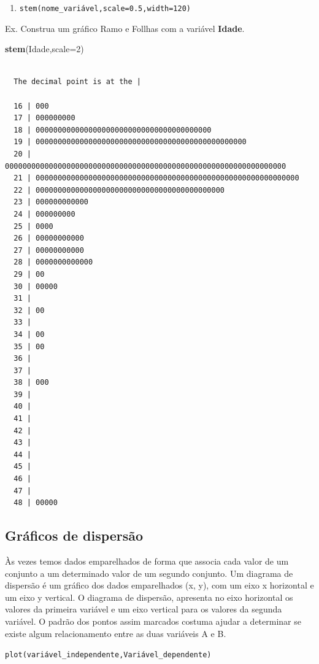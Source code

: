 \documentclass[12pt,brazil,oneside]{book}
\newenvironment{Shaded}{\begin{snugshade}}{\end{snugshade}}
\newcommand{\DataTypeTok}[1]{\textcolor[rgb]{0.13,0.29,0.53}{#1}}
\newcommand{\DecValTok}[1]{\textcolor[rgb]{0.00,0.00,0.81}{#1}}
\newcommand{\KeywordTok}[1]{\textcolor[rgb]{0.13,0.29,0.53}{\textbf{#1}}}
\newcommand{\NormalTok}[1]{#1}
\providecommand{\tightlist}{%
  \setlength{\itemsep}{0pt}\setlength{\parskip}{0pt}}
\begin{document}
\begin{enumerate}
\def\labelenumi{\alph{enumi})}
\setcounter{enumi}{2}
\tightlist
\item
  \texttt{stem(nome\_variável,scale=0.5,width=120)}
\end{enumerate}

Ex. Construa um gráfico Ramo e Follhas com a variável \textbf{Idade}.

\begin{Shaded}
\begin{Highlighting}[]
\KeywordTok{stem}\NormalTok{(Idade,}\DataTypeTok{scale=}\DecValTok{2}\NormalTok{)}
\end{Highlighting}
\end{Shaded}

\begin{verbatim}

  The decimal point is at the |

  16 | 000
  17 | 000000000
  18 | 0000000000000000000000000000000000000000
  19 | 000000000000000000000000000000000000000000000000
  20 | 0000000000000000000000000000000000000000000000000000000000000000
  21 | 000000000000000000000000000000000000000000000000000000000000
  22 | 0000000000000000000000000000000000000000000
  23 | 000000000000
  24 | 000000000
  25 | 0000
  26 | 00000000000
  27 | 00000000000
  28 | 0000000000000
  29 | 00
  30 | 00000
  31 | 
  32 | 00
  33 | 
  34 | 00
  35 | 00
  36 | 
  37 | 
  38 | 000
  39 | 
  40 | 
  41 | 
  42 | 
  43 | 
  44 | 
  45 | 
  46 | 
  47 | 
  48 | 00000
\end{verbatim}

\hypertarget{graficos-de-dispersao}{%
\subsection{Gráficos de dispersão}\label{graficos-de-dispersao}}

Às vezes temos dados emparelhados de forma que associa cada valor de um conjunto a um determinado valor de um segundo conjunto. Um diagrama de dispersão é um gráfico dos dados emparelhados (x, y), com um eixo x horizontal e um eixo y vertical. O diagrama de dispersão, apresenta no eixo horizontal os valores da primeira variável e um eixo vertical para os valores da segunda variável. O padrão dos pontos assim marcados costuma ajudar a determinar se existe algum relacionamento entre as duas variáveis A e B.

\texttt{plot(variável\_independente,Variável\_dependente)}
\end{document}
